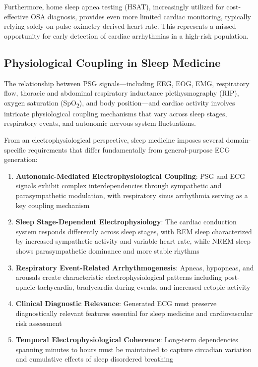 \documentclass[11pt,en]{elegantpaper}
\begin{document}
Furthermore, home sleep apnea testing (HSAT), increasingly utilized for cost-effective OSA diagnosis, provides even more limited cardiac monitoring, typically relying solely on pulse oximetry-derived heart rate. This represents a missed opportunity for early detection of cardiac arrhythmias in a high-risk population.

\subsection{Physiological Coupling in Sleep Medicine}

The relationship between PSG signals—including EEG, EOG, EMG, respiratory flow, thoracic and abdominal respiratory inductance plethysmography (RIP), oxygen saturation (SpO\textsubscript{2}), and body position—and cardiac activity involves intricate physiological coupling mechanisms that vary across sleep stages, respiratory events, and autonomic nervous system fluctuations.

From an electrophysiological perspective, sleep medicine imposes several domain-specific requirements that differ fundamentally from general-purpose ECG generation:

\begin{enumerate}
\item \textbf{Autonomic-Mediated Electrophysiological Coupling}: PSG and ECG signals exhibit complex interdependencies through sympathetic and parasympathetic modulation, with respiratory sinus arrhythmia serving as a key coupling mechanism
\item \textbf{Sleep Stage-Dependent Electrophysiology}: The cardiac conduction system responds differently across sleep stages, with REM sleep characterized by increased sympathetic activity and variable heart rate, while NREM sleep shows parasympathetic dominance and more stable rhythms
\item \textbf{Respiratory Event-Related Arrhythmogenesis}: Apneas, hypopneas, and arousals create characteristic electrophysiological patterns including post-apneic tachycardia, bradycardia during events, and increased ectopic activity
\item \textbf{Clinical Diagnostic Relevance}: Generated ECG must preserve diagnostically relevant features essential for sleep medicine and cardiovascular risk assessment
\item \textbf{Temporal Electrophysiological Coherence}: Long-term dependencies spanning minutes to hours must be maintained to capture circadian variation and cumulative effects of sleep disordered breathing
\end{enumerate}
\end{document}
